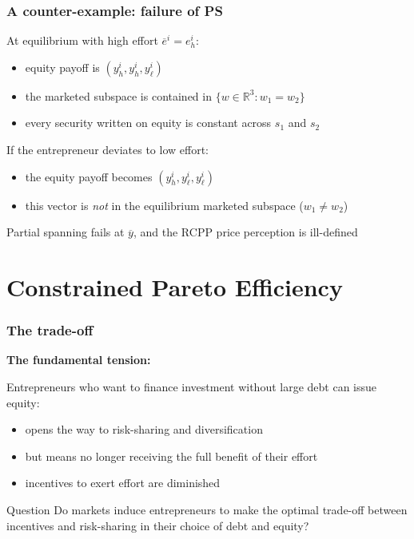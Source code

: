 \documentclass[blue]{beamer}
\def\R{\mathbb{R}}
\theoremstyle{definition}
\theoremstyle{example}
\begin{document}
\begin{frame}\frametitle{A counter-example: failure of PS}
At equilibrium with high effort $\overline{e}^i = e^i_h$:
\begin{itemize}
\item equity payoff is $(y^i_h, y^i_h, y^i_\ell)$
\item the marketed subspace is contained in $\{w \in \R^3 \colon w_1 = w_2\}$
\item every security written on equity is constant across $s_1$ and $s_2$
\end{itemize}
\bigskip

If the entrepreneur deviates to low effort:
\begin{itemize}
\item the equity payoff becomes $(y^i_h, y^i_\ell, y^i_\ell)$
\item this vector is \emph{not} in the equilibrium marketed subspace ($w_1 \neq w_2$)
\end{itemize}
\bigskip

\alert{Partial spanning fails at $\overline{y}$}, and the RCPP price perception is ill-defined
\end{frame}

\section{Constrained Pareto Efficiency}

\begin{frame}\frametitle{The trade-off}
\textbf{The fundamental tension:}
\bigskip

Entrepreneurs who want to finance investment without large debt can issue equity:
\begin{itemize}
\item opens the way to risk-sharing and diversification
\item but means no longer receiving the full benefit of their effort
\item incentives to exert effort are diminished
\end{itemize}
\bigskip

\begin{block}{Question}
Do markets induce entrepreneurs to make the optimal trade-off between incentives and risk-sharing in their choice of debt and equity?
\end{block}
\end{frame}
\end{document}
